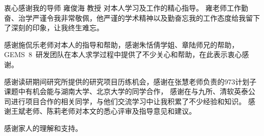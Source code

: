 
\begin{ack}

  衷心感谢我的导师 雍俊海 教授 对本人学习及工作的精心指导。
  雍老师工作勤奋、治学严谨令我非常敬佩，他严谨的学术精神以及勤奋忘我的工作态度给我留下了深刻的印象，让我终生难忘。
  
  感谢施侃乐老师对本人的指导和帮助，感谢朱恬倩学姐、章陆师兄的帮助，GEMS~8~研发团队在本人求学过程中提供了不少关心和帮助，在此表示衷心感谢。
  
  感谢读研期间研究所提供的研究项目历练机会，感谢在张慧老师负责的973计划子课题中有机会能与湖南大学、北京大学的同学合作，
  感谢在与九所、清软英泰公司进行项目合作的相关同学，与他们交流学习中让我积累了不少经验和知识。
  感谢王斌老师、陈莉老师对本文的悉心评审及指导意见和建议。

  感谢家人的理解和支持。

\end{ack}
